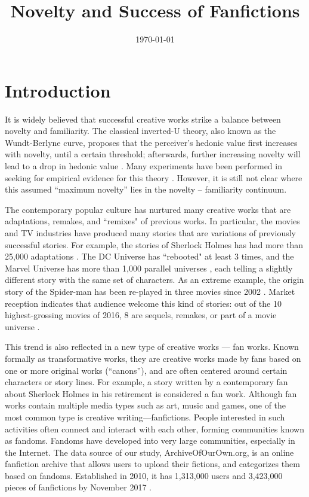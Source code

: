 \documentclass[a4paper]{article}
\begin{document}

\title{Novelty and Success of Fanfictions} %
\date{\today}
\maketitle %

\section{Introduction} %
\label{sec:introduction}

It is widely believed that successful creative works strike a balance between novelty and familiarity. The classical inverted-U theory, also known as the Wundt-Berlyne curve, proposes that the perceiver's hedonic value first increases with novelty, until a certain threshold; afterwards, further increasing novelty will lead to a drop in hedonic value \cite{berlyne1970novelty}. Many experiments have been performed in seeking for empirical evidence for this theory \cite{hargreaves1984effects} \cite{sluckin1980liking}. However, it is still not clear where this assumed ``maximum novelty'' lies in the novelty -- familiarity continuum.

The contemporary popular culture has nurtured many creative works that are adaptations, remakes, and ``remixes" \cite{manovich2007comes} of previous works. In particular, the movies and TV industries have produced many stories that are variations of previously successful stories. For example, the stories of Sherlock Holmes has had more than 25,000 adaptations \cite{doyle2007new}. The DC Universe has ``rebooted" at least 3 times, and the Marvel Universe has more than 1,000 parallel universes \cite{marvelmultiverse}, each telling a slightly different story with the same set of characters. As an extreme example, the origin story of the Spider-man has been re-played in three movies since 2002 \cite{spiderman}. Market reception indicates that audience welcome this kind of stories: out of the 10 highest-grossing movies of 2016, 8 are sequels, remakes, or part of a movie universe \cite{2016film}.

This trend is also reflected in a new type of creative works --- fan works. Known formally as transformative works, they are creative works made by fans based on one or more original works (``canons''), and are often centered around certain characters or story lines\cite{wiki:transf_work}. For example, a story written by a contemporary fan about Sherlock Holmes in his retirement is considered a fan work. Although fan works contain multiple media types such as art, music and games, one of the most common type is creative writing---fanfictions. People interested in such activities often connect and interact with each other, forming communities known as fandoms\cite{wiki:fandom}. Fandoms have developed into very large communities, especially in the Internet. The data source of our study, ArchiveOfOurOwn.org, is an online fanfiction archive that allows users to upload their fictions, and categorizes them based on fandoms. Established in 2010, it has 1,313,000 users and 3,423,000 pieces of fanfictions by November 2017 \cite{ao3stats}.
\end{document}
